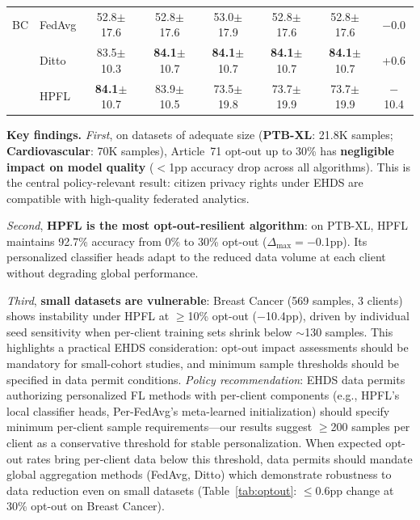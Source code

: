 \documentclass[conference,a4paper]{IEEEtran}
\begin{document}
\begin{table}[t]
\begin{tabular}{ll ccccc c}
\midrule
BC & FedAvg & 52.8{\tiny$\pm$17.6} & 52.8{\tiny$\pm$17.6} & 53.0{\tiny$\pm$17.9} & 52.8{\tiny$\pm$17.6} & 52.8{\tiny$\pm$17.6} & $-$0.0 \\
 & Ditto & 83.5{\tiny$\pm$10.3} & \textbf{84.1}{\tiny$\pm$10.7} & \textbf{84.1}{\tiny$\pm$10.7} & \textbf{84.1}{\tiny$\pm$10.7} & \textbf{84.1}{\tiny$\pm$10.7} & +0.6 \\
 & HPFL & \textbf{84.1}{\tiny$\pm$10.7} & 83.9{\tiny$\pm$10.5} & 73.5{\tiny$\pm$19.8} & 73.7{\tiny$\pm$19.9} & 73.7{\tiny$\pm$19.9} & $-$10.4 \\
\bottomrule
\end{tabular}
\end{table}

\textbf{Key findings.}
\textit{First}, on datasets of adequate size (\textbf{PTB-XL}: 21.8K samples; \textbf{Cardiovascular}: 70K samples), Article~71 opt-out up to 30\% has \textbf{negligible impact on model quality} ($<$1pp accuracy drop across all algorithms). This is the central policy-relevant result: citizen privacy rights under EHDS are compatible with high-quality federated analytics.

\textit{Second}, \textbf{HPFL is the most opt-out-resilient algorithm}: on PTB-XL, HPFL maintains 92.7\% accuracy from 0\% to 30\% opt-out ($\Delta_{\max} = -$0.1pp). Its personalized classifier heads adapt to the reduced data volume at each client without degrading global performance.

\textit{Third}, \textbf{small datasets are vulnerable}: Breast Cancer (569 samples, 3 clients) shows instability under HPFL at $\geq$10\% opt-out ($-$10.4pp), driven by individual seed sensitivity when per-client training sets shrink below $\sim$130 samples. This highlights a practical EHDS consideration: opt-out impact assessments should be mandatory for small-cohort studies, and minimum sample thresholds should be specified in data permit conditions. \textit{Policy recommendation}: EHDS data permits authorizing personalized FL methods with per-client components (e.g., HPFL's local classifier heads, Per-FedAvg's meta-learned initialization) should specify minimum per-client sample requirements---our results suggest $\geq$200 samples per client as a conservative threshold for stable personalization. When expected opt-out rates bring per-client data below this threshold, data permits should mandate global aggregation methods (FedAvg, Ditto) which demonstrate robustness to data reduction even on small datasets (Table~\ref{tab:optout}: $\leq$0.6pp change at 30\% opt-out on Breast Cancer).
\end{document}
